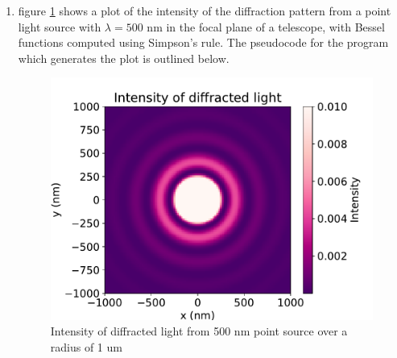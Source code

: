 \documentclass{article}
\newcommand{\code}{\texttt}
\begin{document}
\begin{enumerate}
\begin{enumerate}
    \textbf{Pseudocode}

    \begin{lstlisting}[
        % language=Python,
        numbers=left,
        numberstyle=\small\itshape,
        stepnumber=1,
        frame=lines,
        escapeinside={(*}{*)},
        breaklines=true]   
Initialize and set nvals=100, a=0, b=20
For each value of m of interest:
    Initialize x_arr with nvals equally spaced points from a to b
    Set J_simpson = J(m, x_arr) 
    Set J_scipy = scipy.special.jv(m, x_arr)
    Plot J_simpson and J_scipy vs x_arr
    \end{lstlisting}

    \item figure \ref{fig:1c} shows a plot of the intensity of the diffraction pattern from a point light source with $\lambda=500$ nm in the focal plane of a telescope, with Bessel functions computed using Simpson's rule. The pseudocode for the program which generates the plot is outlined below.
    
    \begin{figure}[H]
        \centering
        \includegraphics[width=0.5\linewidth]{1c.pdf}
        \caption{\label{fig:1c} Intensity of diffracted light from 500 nm point source over a radius of 1 um}
    \end{figure} 


\end{enumerate}
\end{enumerate}
\end{document}
